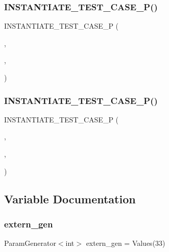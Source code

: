 \subsubsection{\texorpdfstring{INSTANTIATE\_TEST\_CASE\_P()}{INSTANTIATE\_TEST\_CASE\_P()}\hspace{0.1cm}{\footnotesize\ttfamily [1/2]}}
{\footnotesize\ttfamily I\+N\+S\+T\+A\+N\+T\+I\+A\+T\+E\+\_\+\+T\+E\+S\+T\+\_\+\+C\+A\+S\+E\+\_\+P (\begin{DoxyParamCaption}\item[{Multiples\+Of33}]{,  }\item[{\mbox{\hyperlink{classExternalInstantiationTest}{External\+Instantiation\+Test}}}]{,  }\item[{Values(33, 66)}]{ }\end{DoxyParamCaption})}

\mbox{\label{googletest-param-test2-test_8cc_a06b097d2f2746a785ab07df0cc2e80a2}} 
\subsubsection{\texorpdfstring{INSTANTIATE\_TEST\_CASE\_P()}{INSTANTIATE\_TEST\_CASE\_P()}\hspace{0.1cm}{\footnotesize\ttfamily [2/2]}}
{\footnotesize\ttfamily I\+N\+S\+T\+A\+N\+T\+I\+A\+T\+E\+\_\+\+T\+E\+S\+T\+\_\+\+C\+A\+S\+E\+\_\+P (\begin{DoxyParamCaption}\item[{Sequence2}]{,  }\item[{\mbox{\hyperlink{classInstantiationInMultipleTranslaionUnitsTest}{Instantiation\+In\+Multiple\+Translaion\+Units\+Test}}}]{,  }\item[{Values(42 $\ast$3, 42 $\ast$4, 42 $\ast$5)}]{ }\end{DoxyParamCaption})}



\subsection{Variable Documentation}
\mbox{\label{googletest-param-test2-test_8cc_a0f691f1461778d71f30b1fb1dea1cb50}} 
\subsubsection{\texorpdfstring{extern\_gen}{extern\_gen}}
{\footnotesize\ttfamily Param\+Generator$<$int$>$ extern\+\_\+gen = Values(33)}

